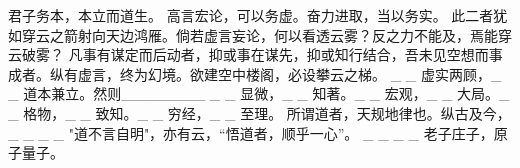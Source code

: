 \documentclass{article}
\begin{document}
君子务本，本立而道生。
高言宏论，可以务虚。奋力进取，当以务实。
此二者犹如穿云之箭射向天边鸿雁。倘若虚言妄论，何以看透云雾？反之力不能及，焉能穿云破雾？
凡事有谋定而后动者，抑或事在谋先，抑或知行结合，吾未见空想而事成者。纵有虚言，终为幻境。欲建空中楼阁，必设攀云之梯。
_ _ 虚实两顾，_ _ 道本兼立。然则________
_ _ 显微，_ _ 知著。_ _ 宏观，_ _ 大局。_ _ 格物，_ _ 致知。_ _ 穷经，_ _ 至理。
所谓道者，天规地律也。纵古及今，_ _ _ _ "道不言自明"，亦有云，“悟道者，顺乎一心”。
_ _ _ _ 老子庄子，原子量子。
\end{document}
